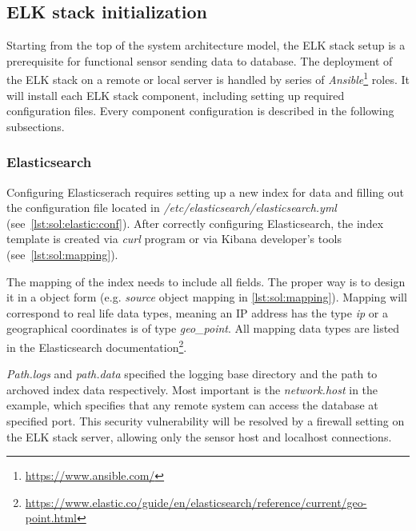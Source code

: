\documentclass[12pt,a4paper,twoside]{report}
\begin{document}
		\subsection{ELK stack initialization} \label{solution:design:elk}
			Starting from the top of the system architecture model, the ELK stack setup is a prerequisite for functional sensor sending data to database. The deployment of the ELK stack on a remote or local server is handled by series of \emph{Ansible}\footnote{\url{https://www.ansible.com/}} roles. It will install each ELK stack component, including setting up required configuration files. Every component configuration is described in the following subsections. 
			\subsubsection*{Elasticsearch}
				Configuring Elasticserach requires setting up a new index for data and filling out the configuration file located in \emph{/etc/elasticsearch/elasticsearch.yml} (see~\autoref{lst:sol:elastic:conf}). After correctly configuring Elasticsearch, the index template is created via \emph{curl} program or via Kibana developer's tools (see~\autoref{lst:sol:mapping}).
				
				The mapping of the index needs to include all fields. The proper way is to design it in a object form (e.g. \emph{source} object mapping in \autoref{lst:sol:mapping}). Mapping will correspond to real life data types, meaning an IP address has the type \emph{ip} or a geographical coordinates is of type \emph{geo\_point}. All mapping data types are listed in the Elasticsearch documentation\footnote{\url{https://www.elastic.co/guide/en/elasticsearch/reference/current/geo-point.html}}.
				\par
				\emph{Path.logs} and \emph{path.data} specified the logging base directory and the path to archoved index data respectively. Most important is the \emph{network.host} in the example, which specifies that any remote system can access the database at specified port. This security vulnerability will be resolved by a firewall setting on the ELK stack server, allowing only the sensor host and localhost connections.
\end{document}
